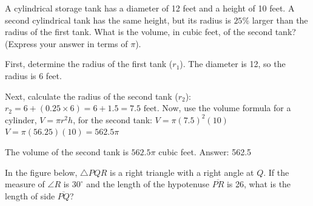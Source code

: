 \documentclass[11pt,paper=a4,answers]{exam}
\begin{document}
\begin{questions}
\question
A cylindrical storage tank has a diameter of 12 feet and a height of 10 feet. A second cylindrical tank has the same height, but its radius is $25\%$ larger than the radius of the first tank. What is the volume, in cubic feet, of the second tank? (Express your answer in terms of $\pi$).
\begin{center}
\end{center}

\begin{solution}
First, determine the radius of the first tank ($r_1$). The diameter is 12, so the radius is 6 feet.
\vspace{5pt}
\begin{center}
Next, calculate the radius of the second tank ($r_2$):
\vspace{5pt}
$r_2 = 6 + (0.25 \times 6) = 6 + 1.5 = 7.5 \text{ feet}$.
\vspace{5pt}
Now, use the volume formula for a cylinder, $V = \pi r^2 h$, for the second tank:
\vspace{5pt}
$V = \pi (7.5)^2 (10)$
\vspace{5pt}
$V = \pi (56.25)(10) = 562.5\pi$
\end{center}
\vspace{5pt}
The volume of the second tank is $562.5\pi$ cubic feet.
\vspace{5pt}
Answer: \colorbox{yellow!100}{562.5}
\end{solution}

\vspace{1cm}

\question
In the figure below, $\triangle PQR$ is a right triangle with a right angle at $Q$. If the measure of $\angle R$ is $30^\circ$ and the length of the hypotenuse $\overline{PR}$ is 26, what is the length of side $\overline{PQ}$?
\begin{center}
\end{center}


\end{questions}
\end{document}
